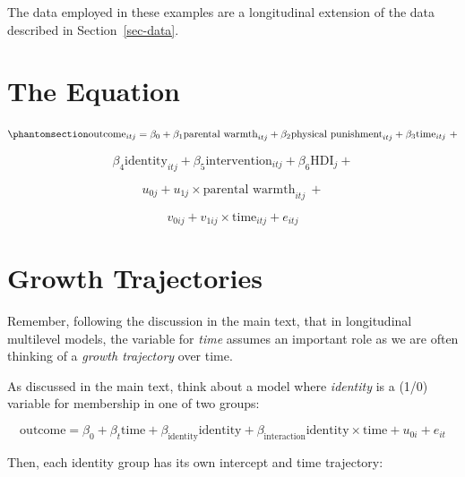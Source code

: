 \documentclass[
  letterpaper,
  DIV=11,
  numbers=noendperiod]{scrreprt}
\begin{document}
The data employed in these examples are a longitudinal extension of the
data described in Section~\ref{sec-data}.

\section{The Equation}\label{the-equation-3}

\begin{equation}\phantomsection\label{eq-MLM-longitudinal}{\text{outcome}_{itj} = \beta_0 + \beta_1 \text{parental warmth}_{itj} + \beta_2 \text{physical punishment}_{itj} + \beta_3 \text{time}_{itj} \ + }\end{equation}

\[\beta_4 \text{identity}_{itj} + \beta_5 \text{intervention}_{itj} + \beta_6 \text{HDI}_{j} +\]

\[u_{0j} + u_{1j} \times \text{parental warmth}_{itj} \ + \]

\[v_{0ij} + v_{1ij} \times \text{time}_{itj} + e_{itj}\]

\section{Growth Trajectories}\label{growth-trajectories}

Remember, following the discussion in the main text, that in
longitudinal multilevel models, the variable for \emph{time} assumes an
important role as we are often thinking of a \emph{growth trajectory}
over time.

As discussed in the main text, think about a model where \emph{identity}
is a (1/0) variable for membership in one of two groups:

\[\text{outcome} = \beta_0 + \beta_t \text{time} + \beta_\text{identity} \text{identity} + \beta_\text{interaction} \text{identity} \times \text{time} + u_{0i} + e_{it}\]

Then, each identity group has its own intercept and time trajectory:
\end{document}
